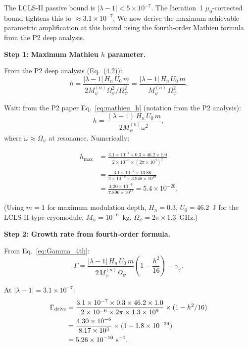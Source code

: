 \documentclass[11pt,twocolumn]{article}
\newcommand{\lam}{\lambda}
\newcommand{\Opsi}{\Omega_\psi}
\newcommand{\gpsi}{\gamma_\psi}
\newcommand{\Mpsi}{M_\psi}
\begin{document}
The LCLS-II passive bound is $|\lam-1| < 5\times10^{-7}$. The Iteration~1
$\mu_0$-corrected bound tightens this to $\approx 3.1\times10^{-7}$. We now
derive the maximum achievable parametric amplification at this bound using
the fourth-order Mathieu formula from the P2 deep analysis.

\textbf{Step 1: Maximum Mathieu $h$ parameter.}

From the P2 deep analysis (Eq.~(4.2)):
\begin{equation}
h = \frac{|\lam-1|\,H_n\,U_0\,m}{2\Mpsi^{(n)}\Opsi^2/\Opsi^2}
= \frac{|\lam-1|\,H_n\,U_0\,m}{\Mpsi^{(n)}\,\Opsi^2}.
\label{eq:h_param}
\end{equation}

Wait: from the P2 paper Eq.~\eqref{eq:mathieu_h} (notation from the P2 analysis):
\begin{equation}
h = \frac{(\lam-1)\,H_n\,U_0\,m}{2\Mpsi^{(n)}\omega^2},
\end{equation}
where $\omega \approx \Opsi$ at resonance. Numerically:

\begin{align}
h_{\max} &= \frac{3.1\times10^{-7} \times 0.3 \times 46.2 \times 1.0}
{2 \times 10^{-6} \times (2\pi\times10^9)^2}
\nonumber\\
&= \frac{3.1\times10^{-7} \times 13.86}
{2 \times 10^{-6} \times 3.948\times10^{19}}
\nonumber\\
&= \frac{4.30\times10^{-6}}
{7.896\times10^{13}}
= 5.4\times10^{-20}.
\label{eq:h_max}
\end{align}

(Using $m=1$ for maximum modulation depth, $H_n = 0.3$, $U_0 = 46.2$~J
for the LCLS-II-type cryomodule, $\Mpsi = 10^{-6}$~kg, $\Opsi = 2\pi\times1.3$~GHz.)

\textbf{Step 2: Growth rate from fourth-order formula.}

From Eq.~\eqref{eq:Gamma_4th}:
\begin{equation}
\Gamma = \frac{|\lam-1|\,H_n\,U_0\,m}{2\Mpsi^{(n)}\Opsi}
\left(1 - \frac{h^2}{16}\right) - \gpsi.
\label{eq:growth_4th}
\end{equation}

At $|\lam-1| = 3.1\times10^{-7}$:
\begin{align}
\Gamma_{\rm drive} &= \frac{3.1\times10^{-7}\times 0.3\times 46.2\times 1.0}
{2\times10^{-6}\times 2\pi\times1.3\times10^9}
\times (1 - h^2/16)
\nonumber\\
&= \frac{4.30\times10^{-6}}{8.17\times10^3}
\times (1 - 1.8\times10^{-39})
\nonumber\\
&= 5.26\times10^{-10}~\text{s}^{-1}.
\label{eq:gamma_drive}
\end{align}
\end{document}
